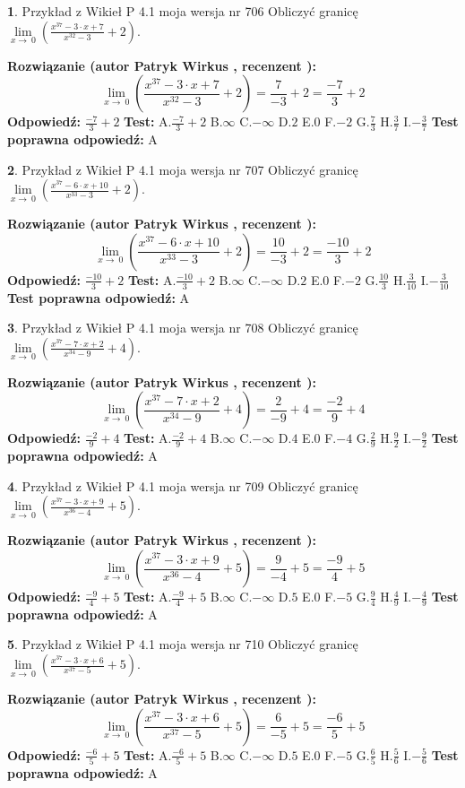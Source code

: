 \documentclass[12pt, a4paper]{article}
\theoremstyle{definition} %
\newtheorem{zad}{}
\newcommand{\zadStart}[1]{\begin{zad}#1\newline}
\newcommand{\zadStop}{\end{zad}}
\newcommand{\rozwStart}[2]{\noindent \textbf{Rozwiązanie (autor #1 , recenzent #2): }\newline}
\newcommand{\rozwStop}{\newline}
\newcommand{\odpStart}{\noindent \textbf{Odpowiedź:}\newline}
\newcommand{\odpStop}{\newline}
\newcommand{\testStart}{\noindent \textbf{Test:}\newline}
\newcommand{\testStop}{\newline}
\newcommand{\kluczStart}{\noindent \textbf{Test poprawna odpowiedź:}\newline}
\newcommand{\kluczStop}{\newline}
\begin{document}
\zadStart{Przykład z Wikieł P 4.1 moja wersja nr 706}
Obliczyć granicę $\lim\limits_{x\to\ 0}(\frac{x^{37}-3 \cdot x +7}{x^{32}-3}+2)$.
\zadStop
\rozwStart{Patryk Wirkus}{}
$$\lim\limits_{x\to\ 0}(\frac{x^{37}-3 \cdot x +7}{x^{32}-3}+2)=\frac{7}{-3}+2=\frac{-7}{3}+2$$
\rozwStop
\odpStart
$\frac{-7}{3}+2$
\odpStop
\testStart
A.$\frac{-7}{3}+2$
B.$\infty$
C.$-\infty$
D.$2$
E.$0$
F.$-2$
G.$\frac{7}{3}$
H.$\frac{3}{7}$
I.$-\frac{3}{7}$
\testStop
\kluczStart
A
\kluczStop



\zadStart{Przykład z Wikieł P 4.1 moja wersja nr 707}
Obliczyć granicę $\lim\limits_{x\to\ 0}(\frac{x^{37}-6 \cdot x +10}{x^{33}-3}+2)$.
\zadStop
\rozwStart{Patryk Wirkus}{}
$$\lim\limits_{x\to\ 0}(\frac{x^{37}-6 \cdot x +10}{x^{33}-3}+2)=\frac{10}{-3}+2=\frac{-10}{3}+2$$
\rozwStop
\odpStart
$\frac{-10}{3}+2$
\odpStop
\testStart
A.$\frac{-10}{3}+2$
B.$\infty$
C.$-\infty$
D.$2$
E.$0$
F.$-2$
G.$\frac{10}{3}$
H.$\frac{3}{10}$
I.$-\frac{3}{10}$
\testStop
\kluczStart
A
\kluczStop



\zadStart{Przykład z Wikieł P 4.1 moja wersja nr 708}
Obliczyć granicę $\lim\limits_{x\to\ 0}(\frac{x^{37}-7 \cdot x +2}{x^{34}-9}+4)$.
\zadStop
\rozwStart{Patryk Wirkus}{}
$$\lim\limits_{x\to\ 0}(\frac{x^{37}-7 \cdot x +2}{x^{34}-9}+4)=\frac{2}{-9}+4=\frac{-2}{9}+4$$
\rozwStop
\odpStart
$\frac{-2}{9}+4$
\odpStop
\testStart
A.$\frac{-2}{9}+4$
B.$\infty$
C.$-\infty$
D.$4$
E.$0$
F.$-4$
G.$\frac{2}{9}$
H.$\frac{9}{2}$
I.$-\frac{9}{2}$
\testStop
\kluczStart
A
\kluczStop



\zadStart{Przykład z Wikieł P 4.1 moja wersja nr 709}
Obliczyć granicę $\lim\limits_{x\to\ 0}(\frac{x^{37}-3 \cdot x +9}{x^{36}-4}+5)$.
\zadStop
\rozwStart{Patryk Wirkus}{}
$$\lim\limits_{x\to\ 0}(\frac{x^{37}-3 \cdot x +9}{x^{36}-4}+5)=\frac{9}{-4}+5=\frac{-9}{4}+5$$
\rozwStop
\odpStart
$\frac{-9}{4}+5$
\odpStop
\testStart
A.$\frac{-9}{4}+5$
B.$\infty$
C.$-\infty$
D.$5$
E.$0$
F.$-5$
G.$\frac{9}{4}$
H.$\frac{4}{9}$
I.$-\frac{4}{9}$
\testStop
\kluczStart
A
\kluczStop



\zadStart{Przykład z Wikieł P 4.1 moja wersja nr 710}
Obliczyć granicę $\lim\limits_{x\to\ 0}(\frac{x^{37}-3 \cdot x +6}{x^{37}-5}+5)$.
\zadStop
\rozwStart{Patryk Wirkus}{}
$$\lim\limits_{x\to\ 0}(\frac{x^{37}-3 \cdot x +6}{x^{37}-5}+5)=\frac{6}{-5}+5=\frac{-6}{5}+5$$
\rozwStop
\odpStart
$\frac{-6}{5}+5$
\odpStop
\testStart
A.$\frac{-6}{5}+5$
B.$\infty$
C.$-\infty$
D.$5$
E.$0$
F.$-5$
G.$\frac{6}{5}$
H.$\frac{5}{6}$
I.$-\frac{5}{6}$
\testStop
\kluczStart
A
\kluczStop
\end{document}
